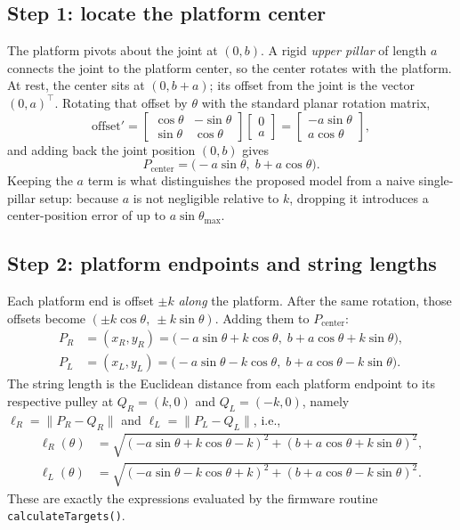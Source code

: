 \documentclass[conference]{IEEEtran}
\begin{document}
\subsection{Step 1: locate the platform center}
The platform pivots about the joint at $(0,b)$. A rigid \emph{upper pillar} of
length $a$ connects the joint to the platform center, so the center rotates with
the platform. At rest, the center sits at $(0,b+a)$; its offset from the joint
is the vector $(0,a)^\top$. Rotating that offset by $\theta$ with the standard
planar rotation matrix,
\begin{equation}
  \text{offset}' =
  \begin{bmatrix}\cos\theta & -\sin\theta\\ \sin\theta & \cos\theta\end{bmatrix}
  \begin{bmatrix}0\\ a\end{bmatrix}
  = \begin{bmatrix}-a\sin\theta\\ a\cos\theta\end{bmatrix},
\end{equation}
and adding back the joint position $(0,b)$ gives
\begin{equation}
  \boxed{\;P_\text{center} = \big(-a\sin\theta,\; b + a\cos\theta\big).\;}
\end{equation}
Keeping the $a$ term is what distinguishes the proposed model from a naive single-pillar
setup: because $a$ is not negligible relative to $k$, dropping it introduces a
center-position error of up to $a\sin\theta_{\max}$.

\subsection{Step 2: platform endpoints and string lengths}
Each platform end is offset $\pm k$ \emph{along} the platform. After the same
rotation, those offsets become $(\pm k\cos\theta,\ \pm k\sin\theta)$. Adding them
to $P_\text{center}$:
\begin{align}
  P_R & = (x_R, y_R) = \big(-a\sin\theta + k\cos\theta,\; b + a\cos\theta + k\sin\theta\big), \\
  P_L & = (x_L, y_L) = \big(-a\sin\theta - k\cos\theta,\; b + a\cos\theta - k\sin\theta\big).
\end{align}
The string length is the Euclidean distance from each platform endpoint to its respective pulley at
$Q_R = (k,0)$ and $Q_L = (-k,0)$, namely $\ell_R = \lVert P_R-Q_R\rVert$ and
$\ell_L = \lVert P_L-Q_L\rVert$, i.e.,
\begin{align}
  \ell_R(\theta) & = \sqrt{(-a\sin\theta + k\cos\theta - k)^2
    + (b + a\cos\theta + k\sin\theta)^2},
  \label{eq:lr}                                               \\
  \ell_L(\theta) & = \sqrt{(-a\sin\theta - k\cos\theta + k)^2
    + (b + a\cos\theta - k\sin\theta)^2}.
  \label{eq:ll}
\end{align}
These are exactly the expressions evaluated by the firmware routine
\texttt{calculateTargets()}.
\end{document}
